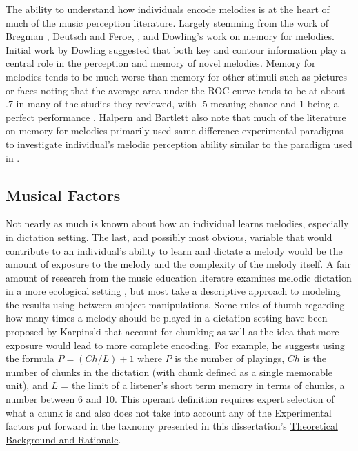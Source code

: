 \documentclass[]{book}
\begin{document}
The ability to understand how individuals encode melodies is at the heart of much of the music perception literature.
Largely stemming from the work of Bregman \citep{bregmanAuditorySceneAnalysis2006}, Deutsch and Feroe, \citep{deutschInternalRepresentationPitch1981}, and Dowling's \citep{bartlettRecognitionTransposedMelodies1980, dowlingExpectancyAttentionMelody1990, dowlingPerceptionInterleavedMelodies1973, dowlingScaleContourTwo1978} work on memory for melodies.
Initial work by Dowling suggested that both key and contour information play a central role in the perception and memory of novel melodies.
Memory for melodies tends to be much worse than memory for other stimuli such as pictures or faces noting that the average area under the ROC curve tends to be at about .7 in many of the studies they reviewed, with .5 meaning chance and 1 being a perfect performance \citep{halpernMemoryMelodies2010}.
Halpern and Bartlett also note that much of the literature on memory for melodies primarily used same difference experimental paradigms to investigate individual's melodic perception ability similar to the paradigm used in \citep{halpernEffectsTimbreTempo2008}.

\hypertarget{musical-factors-1}{%
\subsection{Musical Factors}\label{musical-factors-1}}

Not nearly as much is known about how an individual learns melodies, especially in dictation setting.
The last, and possibly most obvious, variable that would contribute to an individual's ability to learn and dictate a melody would be the amount of exposure to the melody and the complexity of the melody itself.
A fair amount of research from the music education literatre examines melodic dictation in a more ecological setting \citep{buonviriEffectsMusicNotation2015, buonviriEffectsPreparatorySinging2015, buonviriEffectsSilenceSound2018, buonviriEffectsTwoListening2017, buonviriExplorationUndergraduateMusic2014, buonviriMelodicDictationInstruction2015, unsworthAutomatedVersionOperation2005}, but most take a descriptive approach to modeling the results using between subject manipulations.
Some rules of thumb regarding how many times a melody should be played in a dictation setting have been proposed by Karpinski \citep[p.99]{karpinskiAuralSkillsAcquisition2000} that account for chunking as well as the idea that more exposure would lead to more complete encoding.
For example, he suggests using the formula \(P = (Ch/L) + 1\) where \(P\) is the number of playings, \(Ch\) is the number of chunks in the dictation (with chunk defined as a single memorable unit), and \(L\) = the limit of a listener's short term memory in terms of chunks, a number between 6 and 10.
This operant definition requires expert selection of what a chunk is and also does not take into account any of the Experimental factors put forward in the taxnomy presented in this dissertation's \protect\hyperlink{intro}{Theoretical Background and Rationale}.
\end{document}
